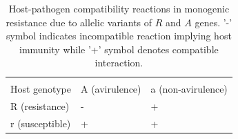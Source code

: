 \documentclass[11pt,dvipsnames,ignorenonframetext,aspectratio=169]{beamer}
\begin{document}
\begin{frame}{}
\protect\hypertarget{section-7}{}
\begin{columns}[T, onlytextwidth]

\begin{table}

\caption{\label{tab:host-path-compatibility-mono}Host-pathogen compatibility reactions in monogenic resistance due to allelic variants of $R$ and $A$ genes. '-' symbol indicates incompatible reaction implying host immunity while '+' symbol denotes compatible interaction.}
\centering
\fontsize{6}{8}\selectfont
\begin{tabular}[t]{>{\raggedright\arraybackslash}p{8em}>{\raggedright\arraybackslash}p{6em}>{\raggedright\arraybackslash}p{6em}}
\toprule
\multicolumn{1}{c}{ } & \multicolumn{2}{c}{Pathogen genotype} \\
\cmidrule(l{3pt}r{3pt}){2-3}
Host genotype & A (avirulence) & a (non-avirulence)\\
\midrule
R (resistance) & - & +\\
r (susceptible) & + & +\\
\bottomrule
\end{tabular}
\end{table}


\begin{table}


\end{table}
\end{columns}
\end{frame}
\end{document}
